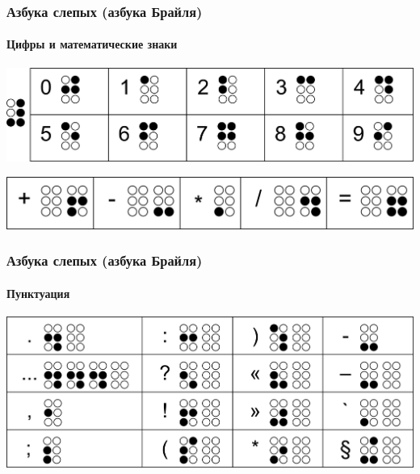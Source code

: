 \begin{frame}
    \frametitle{Азбука слепых (азбука Брайля)}
    \framesubtitle{Цифры и математические знаки}
    
    \begin{center}
        \includegraphics[width=.8\textwidth]{fig/braileDigits}
    \end{center}
    
    \begin{center}
        \includegraphics[width=.8\textwidth]{fig/braileMath}
    \end{center}
\end{frame}

\begin{frame}
    \frametitle{Азбука слепых (азбука Брайля)}
    \framesubtitle{Пунктуация}
    
    \begin{center}
        \includegraphics[width=.8\textwidth]{fig/brailePunctum}
    \end{center}
\end{frame}

